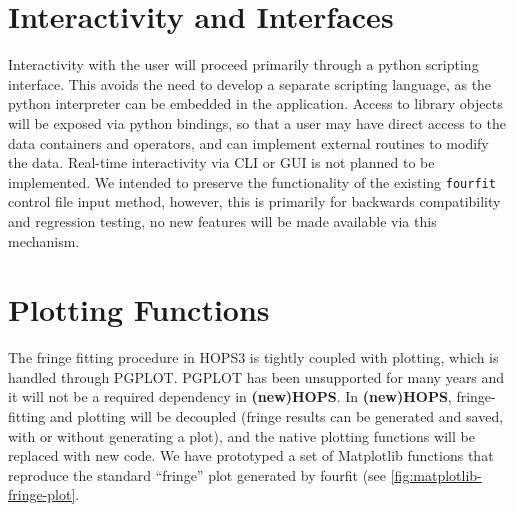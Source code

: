 \documentclass[hidelinks]{article}
\let\Oldsection\section
\renewcommand{\section}{\FloatBarrier\Oldsection}
\newcommand{\nuHOPS}{{\bf {\color{dkgreen} (new)HOPS}}}
\begin{document}
\section{Interactivity and Interfaces}

Interactivity with the user will proceed primarily through a python scripting interface. This avoids the need to develop a separate scripting language, 
as the python interpreter can be embedded in the application. Access to library objects will be exposed via python bindings, so that a user may have direct access 
to the data containers and operators, and can implement external routines to modify the data. Real-time interactivity via CLI or GUI is 
not planned to be implemented. We intended to preserve the functionality of the existing \texttt{fourfit} control file input method, however, this
is primarily for backwards compatibility and regression testing, no new features will be made available via this mechanism.


\section{Plotting Functions}

The fringe fitting procedure in HOPS3 is tightly coupled with plotting, which is handled through PGPLOT. PGPLOT has been unsupported for many years and it will not be a required dependency in \nuHOPS. In \nuHOPS, fringe-fitting and plotting will be decoupled (fringe results can be generated and saved, with or without generating a plot), and the native plotting functions will be replaced with new code. We have prototyped a set of Matplotlib functions that reproduce the standard ``fringe'' plot generated by fourfit (see \ref{fig:matplotlib-fringe-plot}.
\end{document}
